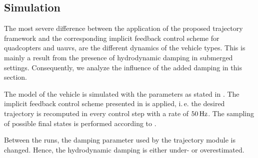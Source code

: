 \subsection{Simulation}
The most severe difference between the application of the proposed trajectory framework and the corresponding implicit feedback control scheme for quadcopters and \acp{uauv}, are the different dynamics of the vehicle types. This is mainly a result from the presence of hydrodynamic damping in submerged settings. Consequently, we analyze the influence of the added damping in this section.

The model of the vehicle is simulated with the parameters as stated in . The implicit feedback control scheme presented in  is applied, i.\,e. the desired trajectory is recomputed in every control step with a rate of $\unit[50]{Hz}$. The sampling of possible final states is performed according to .

Between the runs, the damping parameter used by the trajectory module is changed. Hence, the hydrodynamic damping is either under- or overestimated.

